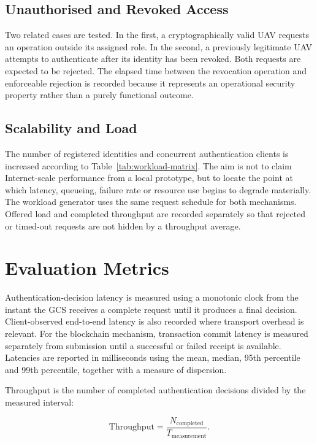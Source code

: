 \subsection{Unauthorised and Revoked Access}
\label{subsec:unauthorised-scenario}

Two related cases are tested. In the first, a cryptographically valid UAV requests an operation outside its assigned role. In the second, a previously legitimate UAV attempts to authenticate after its identity has been revoked. Both requests are expected to be rejected. The elapsed time between the revocation operation and enforceable rejection is recorded because it represents an operational security property rather than a purely functional outcome.

\subsection{Scalability and Load}
\label{subsec:scalability-scenario}

The number of registered identities and concurrent authentication clients is increased according to Table~\ref{tab:workload-matrix}. The aim is not to claim Internet-scale performance from a local prototype, but to locate the point at which latency, queueing, failure rate or resource use begins to degrade materially. The workload generator uses the same request schedule for both mechanisms. Offered load and completed throughput are recorded separately so that rejected or timed-out requests are not hidden by a throughput average.

\section{Evaluation Metrics}
\label{sec:evaluation-metrics}

Authentication-decision latency is measured using a monotonic clock from the instant the GCS receives a complete request until it produces a final decision. Client-observed end-to-end latency is also recorded where transport overhead is relevant. For the blockchain mechanism, transaction commit latency is measured separately from submission until a successful or failed receipt is available. Latencies are reported in milliseconds using the mean, median, 95th percentile and 99th percentile, together with a measure of dispersion.

Throughput is the number of completed authentication decisions divided by the measured interval:

\begin{equation}
    \mathrm{Throughput} = \frac{N_{\mathrm{completed}}}{T_{\mathrm{measurement}}}.
\end{equation}

